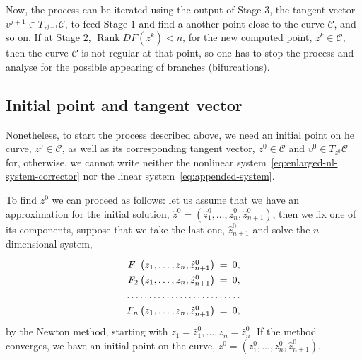 \documentclass[11pt,reqno,twoside]{article}
\newcommand{\rank}{\mathop{\mathrm{Rank}}}
\theoremstyle{remark}
\begin{document}
\vspace\baselineskip 
Now, the process can be iterated using the output of Stage $3$, the tangent
vector $v^{j+1}\in T_{z^{j+1}}\mathcal{C}$, to feed Stage $1$ and find a
another point close to the curve  $\mathcal{C}$, and so on. If at Stage
$2$, $\rank DF\left(z^{k}\right) < n$, for the new computed point,
$z^{k}\in\mathcal{C}$, then the curve $\mathcal{C}$ is not regular at that
point, so one has to stop the process and analyse for the possible
appearing of branches (bifurcations).

\subsection*{Initial point and tangent vector}
Nonetheless, to start the process described above, we need an initial point
on he curve, $z^{0}\in\mathcal{C}$, as well as its corresponding tangent
vector, $z^{0}\in\mathcal{C}$ and $v^{0}\in T_{z^{0}}\mathcal{C}$ for,
otherwise, we cannot write neither the nonlinear
system~\eqref{eq:enlarged-nl-system-corrector} nor the linear
system~\eqref{eq:appended-system}.

To find $z^{0}$ we can proceed as follows: let us assume that we have an
approximation for the initial solution, $\hat{z}^{0} =
\left(\hat{z}^{0}_{1},\dots,\hat{z}^{0}_{n}, \hat{z}^{0}_{n+1}\right)$,
then we fix one of its components, suppose that we take the last one,
$\hat{z}^{0}_{n+1}$ and solve the $n$-dimensional system,
\begin{displaymath}
  \renewcommand{\arraystretch}{1.3}
  \begin{array}{rcl}
    F_{1}\left(z_{1},\dots, z_{n},
    \hat{z}^{0}_{n+1}\right)&\!\!\!=&\!\!\! 0,\\
    F_{2}\left(z_{1},\dots, z_{n},
  \hat{z}^{0}_{n+1}\right)&\!\!\!=&\!\!\! 0,\\ 
  \hdotsfor{3}\\ 
    F_{n}\left(z_{1},\dots, z_{n},
  \hat{z}^{0}_{n+1}\right)&\!\!\!=&\!\!\! 0, 
\end{array}
\end{displaymath}
by the Newton method, starting with $z_{1} = \hat{z}^{0}_{1},\dots,z_{n} =
\hat{z}^{0}_{n}$. If the method converges, we have an initial point on the
curve, $z^{0} = \left(z^{0}_{1},\dots,z^{0}_{n},\hat{z}^{0}_{n+1}\right)$.
\end{document}
